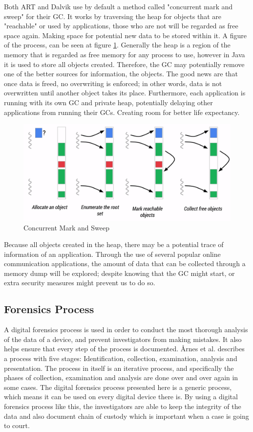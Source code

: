Both ART and Dalvik use by default a method called "concurrent mark and sweep" for their GC\cite{ARTGC,DALVIKGC}. It works by traversing the heap for objects that are "reachable" or used by applications, those who are not will be regarded as free space again. Making space for potential new data to be stored within it. A figure of the process, can be seen at figure \ref{fig:mas}. Generally the heap is a region of the memory that is regarded as free memory for any process to use, however in Java it is used to store all objects created. Therefore, the GC may potentially remove one of the better sources for information, the objects. The good news are that once data is freed, no overwriting is enforced; in other words, data is not overwritten until another object takes its place\cite{DALVIKGC}. Furthermore, each application is running with its own GC and private heap, potentially delaying other applications from running their GCs.\cite{AndroidMemManagement} Creating room for better life expectancy.

\begin{figure}[h]
  \includegraphics[width=0.5 \textwidth]{figures/gc}
  \caption{Concurrent Mark and Sweep\cite{ARTGC}}
  \label{fig:mas}
\end{figure}

Because all objects created in the heap, there may be a potential trace of information of an application. Through the use of several popular online communication applications, the amount of data that can be collected through a memory dump will be explored; despite knowing that the GC might start, or extra security measures might prevent us to do so.

\subsection{Forensics Process}
A digital forensics process is used in order to conduct the most thorough analysis of the data of a device, and prevent investigators from making mistakes. It also helps ensure that every step of the process is documented. \r{A}rnes et al. describes a process with five stages: Identification, collection, examination, analysis and presentation\cite{DiFoBook}. The process in itself is an iterative process, and specifically the phases of collection, examination and analysis are done over and over again in some cases. The digital forensics process presented here is a generic process, which means it can be used on every digital device there is. By using a digital forensics process like this, the investigators are able to keep the integrity of the data and also document chain of custody which is important when a case is going to court.

